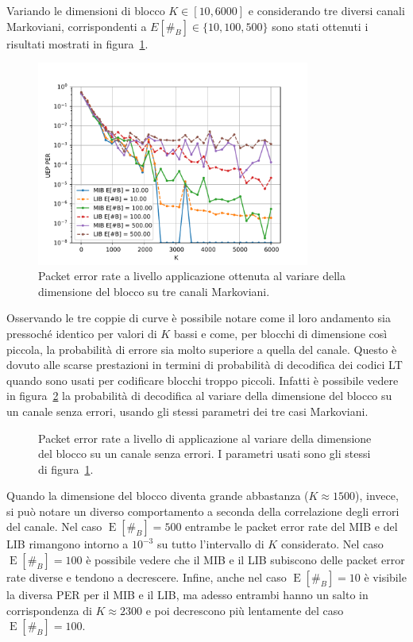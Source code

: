 \documentclass[italian, a4paper, 12pt]{article}
\newcommand{\E}[1]{\operatorname{E}\left[#1\right]}
\newcommand{\EnB}{\E{\#_B}}
\begin{document}
Variando le dimensioni di blocco $K \in [10, 6000]$ e considerando tre
diversi canali Markoviani, corrispondenti a $E[\#_B] \in \{10, 100,
500\}$ sono stati ottenuti i risultati mostrati in
figura~\ref{fig:markov}.
%
\begin{figure}[htb]
  \centering
  \includegraphics[width=0.8\textwidth]{plot_markov}
  \caption{Packet error rate a livello applicazione ottenuta al
    variare della dimensione del blocco su tre canali Markoviani.}
  \label{fig:markov}
\end{figure}

Osservando le tre coppie di curve è possibile notare come il loro
andamento sia pressoché identico per valori di $K$ bassi e come, per
blocchi di dimensione così piccola, la probabilità di errore sia molto
superiore a quella del canale.
%
Questo è dovuto alle scarse prestazioni in termini di probabilità di
decodifica dei codici LT quando sono usati per codificare blocchi
troppo piccoli.
%
Infatti è possibile vedere in figura~\ref{fig:noerrk} la probabilità di
decodifica al variare della dimensione del blocco su un canale senza
errori, usando gli stessi parametri dei tre casi Markoviani.
%
\begin{figure}[htb]
  \centering
  \caption{Packet error rate a livello di applicazione al variare
    della dimensione del blocco su un canale senza errori. I parametri
    usati sono gli stessi di figura~\ref{fig:markov}.}
  \label{fig:noerrk}
\end{figure}

Quando la dimensione del blocco diventa grande abbastanza ($K \approx
1500$), invece, si può notare un diverso comportamento a seconda della
correlazione degli errori del canale.
%
Nel caso $\EnB = 500$ entrambe le packet error rate del MIB e del LIB
rimangono intorno a $10^{-3}$ su tutto l'intervallo di $K$
considerato. Nel caso $\EnB = 100$ è possibile vedere che il MIB e il
LIB subiscono delle packet error rate diverse e tendono a
decrescere. Infine, anche nel caso $\EnB = 10$ è visibile la diversa
PER per il MIB e il LIB, ma adesso entrambi hanno un salto in
corrispondenza di $K \approx 2300$ e poi decrescono più lentamente del
caso $\EnB = 100$.
\end{document}

